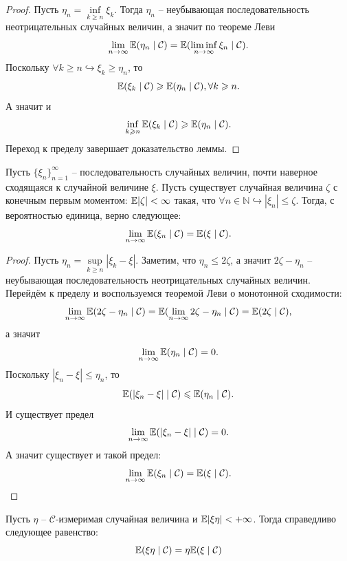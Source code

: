 \begin{proof}
    Пусть $\eta_n = \inf\limits_{k \geq n} \xi_k$. Тогда $\eta_n$ -- неубывающая последовательность неотрицательных случайных величин, а значит по теореме Леви
    \[
        \lim\limits_{n \rightarrow \infty} \mathbb{E}(\eta_n \mid \mathcal{C}) = \mathbb{E}(\liminf\limits_{n \rightarrow \infty} \xi_n \mid \mathcal{C}).
    \]
    Поскольку $\forall k \geq n \hookrightarrow \xi_k \geq \eta_n$, то 
    \[
        \mathbb{E}(\xi_k\mid \mathcal{C}) \geqslant \mathbb{E}(\eta_n \mid \mathcal{C}), \forall k \geqslant n.
    \]
    А значит и 
    \[
        \inf\limits_{k \geqslant n} \mathbb{E}(\xi_k \mid \mathcal{C}) \geqslant \mathbb{E}(\eta_n \mid \mathcal{C}).
    \]
    Переход к пределу завершает доказательство леммы.
\end{proof}
\begin{theorem}
    Пусть $\{\xi_n\}_{n = 1}^\infty$ -- последовательность случайных величин, почти наверное сходящаяся к случайной величине $\xi$. Пусть существует случайная величина $\zeta$ с конечным первым моментом: $\mathbb{E} |\zeta| < \infty$ такая, что $\forall n \in \mathbb{N} \hookrightarrow |\xi_n| \leq \zeta$. Тогда, с вероятностью единица, верно следующее:
    \[
        \lim\limits_{n \rightarrow \infty} \mathbb{E}(\xi_n \mid \mathcal{C}) = \mathbb{E}(\xi \mid \mathcal{C}).
    \]
\end{theorem}
\begin{proof}
    Пусть $\eta_n = \sup\limits_{k \geq n} |\xi_k - \xi|$. Заметим, что $\eta_n \leq 2\zeta$, а значит $2\zeta - \eta_n$ -- неубывающая последовательность неотрицательных случайных величин. Перейдём к пределу и воспользуемся теоремой Леви о монотонной сходимости:
    \[
        \lim\limits_{n \rightarrow \infty} \mathbb{E}( 2\zeta - \eta_n \mid \mathcal{C}) = \mathbb{E}(\lim\limits_{n \rightarrow \infty} 2 \zeta - \eta_n \mid \mathcal{C}) = \mathbb{E} (2 \zeta \mid \mathcal{C}),
    \]
    а значит 
    \[
        \lim\limits_{n \rightarrow \infty} \mathbb{E}( \eta_n \mid \mathcal{C}) = 0.
    \]
    Поскольку $|\xi_n - \xi| \leq \eta_n$, то
    \[
        \mathbb{E}(|\xi_n - \xi| \mid\mathcal{C}) \leqslant \mathbb{E} (\eta_n \mid \mathcal{C}).
    \]
    И существует предел 
    \[
        \lim\limits_{n \rightarrow \infty} \mathbb{E}(|\xi_n - \xi| \mid \mathcal{C}) = 0.
    \]
    А значит существует и такой предел:
    \[
        \lim\limits_{n \rightarrow \infty} \mathbb{E}(\xi_n \mid \mathcal{C}) = \mathbb{E}(\xi \mid \mathcal{C}).
    \]
\end{proof}
\begin{property}
    Пусть $\eta$ -- $\mathcal{C}$-измеримая случайная величина и $\mathbb{E}|\xi\eta| < +\infty$. Тогда справедливо следующее равенство:
    \[
        \mathbb{E}(\xi \eta \mid \mathcal{C}) = \eta \mathbb{E}(\xi \mid \mathcal{C})
    \]
\end{property}
